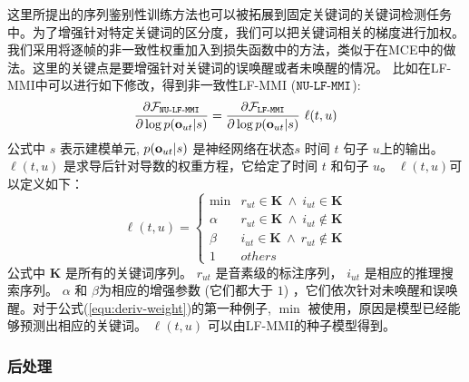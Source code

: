 这里所提出的序列鉴别性训练方法也可以被拓展到固定关键词的关键词检测任务中。为了增强针对特定关键词的区分度，我们可以把关键词相关的梯度进行加权。我们采用将逐帧的非一致性权重加入到损失函数中的方法，类似于\cite{meng2016non}在MCE中的做法。这里的关键点是要增强针对关键词的误唤醒或者未唤醒的情况。
比如在LF-MMI中可以进行如下修改，得到非一致性LF-MMI ($\tt{NU\text{-}LF\text{-}MMI}$):
\begin{equation}
\label{equ:kws-nummi}
\begin{split}
\frac{\partial \mathcal{F}_{\tt{NU\text{-}LF\text{-}MMI}}}{\partial\log p({\bf o}_{ut}|s)}
=\frac{\partial \mathcal{F}_{\tt{LF\text{-}MMI}}}{\partial\log p({\bf o}_{ut}|s)}\   \ell(t,u)
\end{split}
\end{equation}
公式中 $s$ 表示建模单元, $p({\bf o}_{ut}|s)$ 是神经网络在状态$s$ 时间 $t$ 句子 $u$上的输出。
$\ell(t,u)$ 是求导后针对导数的权重方程，它给定了时间 $t$ 和句子 $u$。 $\ell(t,u)$可以定义如下：
\begin{equation}
\label{equ:deriv-weight}
\ell(t,u)=
\begin{cases}
\mathop{\min(\alpha,\beta)}& r_{ut}\in \mathbf{K}\ \land\ i_{ut}\in \mathbf{K}\\
\alpha& r_{ut}\in \mathbf{K}\ \land\ i_{ut}\notin \mathbf{K}\\
\beta& i_{ut}\in \mathbf{K}\ \land\ r_{ut}\notin \mathbf{K}\\
1& others
\end{cases}
\end{equation}
公式中 $\mathbf{K}$ 是所有的关键词序列。 $r_{ut}$   是音素级的标注序列， $i_{ut}$ 是相应的推理搜索序列。 $\alpha$ 和 $\beta$为相应的增强参数 (它们都大于 $1$) ，它们依次针对未唤醒和误唤醒。对于公式(\ref{equ:deriv-weight})的第一种例子, $\mathop{\min(\alpha,\beta)}$ 被使用，原因是模型已经能够预测出相应的关键词。 $\ell(t,u)$ 可以由LF-MMI的种子模型得到。

\subsubsection{后处理}
\label{Sec:post-process}

